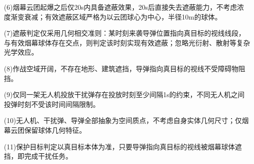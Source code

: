 \documentclass[12pt,a4paper]{article}
\begin{document}
	(6)烟幕云团起爆之后仅20s内具备遮蔽效果，20s后直接失去遮蔽能力，不考虑浓度渐变衰减；有效遮蔽区域严格为以云团球心为中心，半径10m的球体。
	
	(7)遮蔽判定仅采用几何相交准则：某时刻来袭导弹位置指向真目标的视线线段，与有效烟幕球体存在交点，则判定该时刻实现有效遮蔽；忽略光衍射、散射等复杂光学效应。
	
	(8)作战空域开阔，不存在地形、建筑遮挡，导弹指向真目标的视线不受障碍物阻挡。
	
	(9)仅同一架无人机投放干扰弹存在投放时刻至少间隔1s的约束，不同无人机之间投弹时刻不受该时间间隔限制。
	
	(10)无人机、干扰弹、导弹全部抽象为空间质点，不考虑自身实体几何尺寸；仅烟幕云团保留球体几何特征。
	
	(11)保护目标判定以真目标本体为准，只要导弹指向真目标的视线被烟幕球体遮挡，即完成干扰任务。
	
\end{document}
